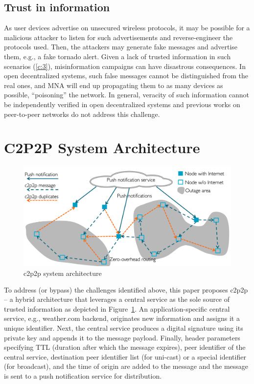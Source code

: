 \documentclass[conference]{IEEEtran}
\begin{document}
\subsection{Trust in information}
%
As user devices advertise on unsecured wireless protocols, it may be
possible for a malicious attacker to listen for such advertisements
and reverse-engineer the protocols used. Then, the attackers may
generate fake messages and advertise them, e.g., a fake tornado
alert. Given a lack of trusted information in such scenarios
(\ref{c:3}), misinformation campaigns can have disastrous
consequences.  In open decentralized systems, such false messages
cannot be distinguished from the real ones, and MNA will end up
propagating them to as many devices as possible, ``poisoning'' the
network. In general, veracity of such information cannot be
independently verified in open decentralized systems and previous
works on peer-to-peer networks do not address this challenge.
%
\section{C2P2P System Architecture}
\label{sec:architecture}
%
\begin{figure}[htbp]
\centerline{\includegraphics[width=\columnwidth]{figs/arch}}
\caption{c2p2p system architecture}
\label{fig:arch}
\end{figure}

To address (or bypass) the challenges identified above, this paper
proposes c2p2p -- a hybrid architecture that leverages a central
service as the sole source of trusted information as depicted in
Figure~\ref{fig:arch}. An application-specific central service, e.g.,
weather.com backend, originates new information and
assigns it a unique identifier. Next, the central service produces a
digital signature using its private key and appends it to the message
payload. Finally, header parameters specifying TTL (duration after
which the message expires), peer identifier of the central service,
destination peer identifier list (for uni-cast) or a special identifier
(for broadcast), and the time of origin are added to the message and
the message is sent to a push notification service for distribution.
\end{document}
